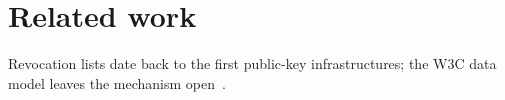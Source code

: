 \chapter{Related work}

Revocation lists date back to the first public-key infrastructures; the W3C data model leaves
the mechanism open~\cite{w3c2025vcdm}.
